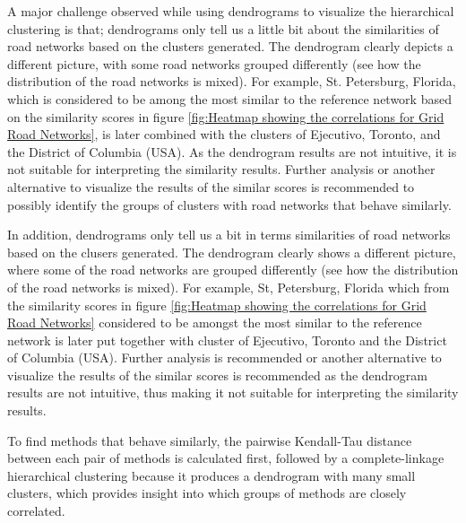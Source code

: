A major challenge observed while using dendrograms to visualize the hierarchical clustering is that; dendrograms only tell us a little bit about the similarities of road networks based on the clusters generated. The dendrogram clearly depicts a different picture, with some road networks grouped differently (see how the distribution of the road networks is mixed). For example, St. Petersburg, Florida, which is considered to be among the most similar to the reference network based on the similarity scores in figure \ref{fig:Heatmap showing the correlations for Grid Road Networks}, is later combined with the clusters of Ejecutivo, Toronto, and the District of Columbia (USA). As the dendrogram results are not intuitive, it is not suitable for interpreting the similarity results. Further analysis or another alternative to visualize the results of the similar scores is recommended to possibly identify the groups of clusters with road networks that behave similarly.

In addition, dendrograms only tell us a bit in terms similarities of road networks based on the clusers generated. The dendrogram clearly shows a different picture, where some of the road networks are grouped differently (see how the distribution of the road networks is mixed). For example, St, Petersburg, Florida which from the similarity scores in figure \ref{fig:Heatmap showing the correlations for Grid Road Networks} considered to be amongst the most similar to the reference network is later put together with cluster of Ejecutivo, Toronto and the District of Columbia (USA). Further analysis is recommended or another alternative to visualize the results of the similar scores is recommended as the dendrogram results are not intuitive, thus making it not suitable for interpreting the similarity results.

To find methods that behave similarly, the pairwise Kendall-Tau distance between each pair of methods is calculated first, followed by a complete-linkage hierarchical clustering because it produces a dendrogram with many small clusters, which provides insight into which groups of methods are closely correlated.

